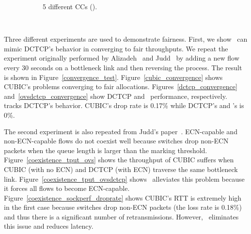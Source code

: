 \begin{figure}[!t]
\begin{subfigure}[b]{0.45\textwidth}
                \caption{5 different CCs (\acdc{}).}
                \label{fairness_5CC_with_ours}
        \end{subfigure}
	\caption{~} 
 	\label{tput_fairness_coexistence}
\end{figure}	


Three different experiments are used to demonstrate fairness. First, we show~\acdc{} can mimic DCTCP's 
behavior in converging to fair throughputs. We repeat the experiment originally performed 
by Alizadeh~\cite{alizadeh2011data} and Judd~\cite{judd2015nsdi} by 
adding a new flow every 30 seconds on a bottleneck link and then reversing the process. 
The result is shown in Figure~\ref{convergence_test}.
Figure~\ref{cubic_convergence} shows CUBIC's problems converging to fair allocations.
Figures~\ref{dctcp_convergence}
and~\ref{ovsdctcp_convergence} show DCTCP and~\acdc{} performance, respectively.~\acdc{} tracks DCTCP's behavior.
CUBIC's drop rate is 0.17\% while DCTCP's and \acdc{}'s is 0\%. 

The second experiment is also repeated from Judd's paper~\cite{judd2015nsdi}. 
ECN-capable and non-ECN-capable flows do not coexist well because switches
drop non-ECN packets when the queue length is larger than the marking threshold. Figure~\ref{coexistence_tput_ovs}
shows the throughput of CUBIC suffers when CUBIC (with no ECN) and DCTCP (with ECN) traverse the same bottleneck link.
Figure~\ref{coexistence_tput_ovsdctcp} shows~\acdc{} alleviates this problem 
because it forces all flows to become ECN-capable.
Figure~\ref{coexistence_sockperf_droprate} shows CUBIC's RTT is extremely high
in the first case because switches drop non-ECN packets (the loss rate is 0.18\%) and thus
there is a significant number of retransmissions. However,~\acdc{} eliminates 
this issue and reduces latency.

